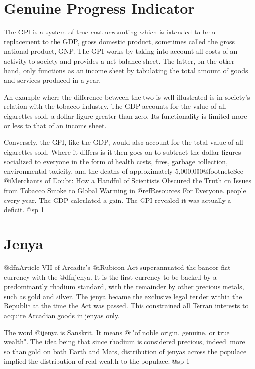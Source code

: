 \section{Genuine Progress Indicator}
The GPI is a system of true cost accounting which is intended to be a replacement to the GDP, gross domestic product, sometimes called the gross national product, GNP. The GPI works by taking into account all costs of an activity to society and provides a net balance sheet. The latter, on the other hand, only functions as an income sheet by tabulating the total amount of goods and services produced in a year. 

An example where the difference between the two is well illustrated is in society's relation with the tobacco industry. The GDP accounts for the value of all cigarettes sold, a dollar figure greater than zero. Its functionality is limited more or less to that of an income sheet.

Conversely, the GPI, like the GDP, would also account for the total value of all cigarettes sold. Where it differs is it then goes on to subtract the dollar figures socialized to everyone in the form of health costs, fires, garbage collection, environmental toxicity, and the deaths of approximately 5,000,000@footnote{See @i{Merchants of Doubt: How a Handful of Scientists Obscured the Truth on Issues from Tobacco Smoke to Global Warming} in @ref{Resources For Everyone}.} people every year. The GDP calculated a gain. The GPI revealed it was actually a deficit.
@sp 1

\section{Jenya}
@dfn{Article VII} of Arcadia's @i{Rubicon Act} superannuated the bancor fiat currency with the @dfn{jenya}. It is the first currency to be backed by a predominantly rhodium standard, with the remainder by other precious metals, such as gold and silver. The jenya became the exclusive legal tender within the Republic at the time the Act was passed. This constrained all Terran interests to acquire Arcadian goods in jenyas only.

The word @i{jenya} is Sanskrit. It means @i{"of noble origin, genuine, or true wealth"}. The idea being that since rhodium is considered precious, indeed, more so than gold on both Earth and Mars, distribution of jenyas across the populace implied the distribution of real wealth to the populace.
@sp 1

